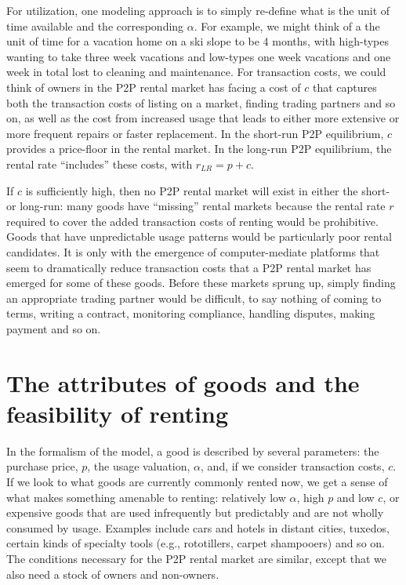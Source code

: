 \documentclass[11pt]{article}
\begin{document}
For utilization, one modeling approach is to simply re-define what is the unit of time available and the corresponding $\alpha$. 
For example, we might think of a the unit of time for a vacation home on a ski slope to be 4 months, with high-types wanting to take three week vacations and low-types one week vacations and one week in total lost to cleaning and maintenance.      
For transaction costs, we could think of owners in the P2P rental market has facing a cost of $c$ that captures both the transaction costs of listing on a market, finding trading partners and so on, as well as the cost from increased usage that leads to either more extensive or more frequent repairs or faster replacement.
In the short-run P2P equilibrium, $c$ provides a price-floor in the rental market.  
In the long-run P2P equilibrium, the rental rate ``includes'' these costs, with $r_{LR} = p + c$. 

If $c$ is sufficiently high, then no P2P rental market will exist in either the short- or long-run: 
many goods have ``missing'' rental markets because the rental rate $r$ required to cover the added transaction costs of renting would be prohibitive.
Goods that have unpredictable usage patterns would be particularly poor rental candidates.  
It is only with the emergence of computer-mediate platforms that seem to dramatically reduce transaction costs that a P2P rental market has emerged for some of these goods. 
Before these markets sprung up, simply finding an appropriate trading partner would be difficult, to say nothing of coming to terms, writing a contract, monitoring compliance, handling disputes, making payment and so on. 

\section{The attributes of goods and the feasibility of renting} 
In the formalism of the model, a good is described by several parameters: the purchase price, $p$, the usage valuation, $\alpha$, and, if we consider transaction costs, $c$.  
If we look to what goods are currently commonly rented now, we get a sense of what makes something amenable to renting: 
relatively low $\alpha$, high $p$ and low $c$, or expensive goods that are used infrequently but predictably and are not wholly consumed by usage. 
Examples include cars and hotels in distant cities, tuxedos, certain kinds of specialty tools (e.g., rototillers, carpet shampooers) and so on. 
The conditions necessary for the P2P rental market are similar, except that we also need a stock of owners and non-owners. 
\end{document}
